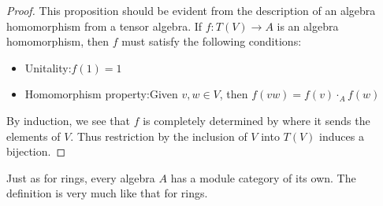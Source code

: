 \documentclass[../thesis.tex]{subfiles}
\begin{document}
            \begin{proof}
                This proposition should be evident from the description of an algebra homomorphism from a tensor algebra. If $f: T(V) \rightarrow A$ is an algebra homomorphism, then $f$ must satisfy the following conditions:
                \begin{itemize}
                    \item Unitality:\quad $f(1) = 1$
                    \item Homomorphism property:\quad Given $v,w\in V$, then $f(vw) = f(v)\cdot_Af(w)$
                \end{itemize}
                By induction, we see that $f$ is completely determined by where it sends the elements of $V$. Thus restriction by the inclusion of $V$ into $T(V)$ induces a bijection.
            \end{proof}

            Just as for rings, every algebra $A$ has a module category of its own. The definition is very much like that for rings.
\end{document}
